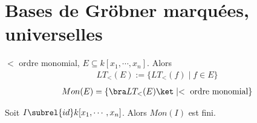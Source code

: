     \section{Bases de Gröbner marquées, universelles}
        \begin{nota}
            $<$ ordre monomial, $E \subseteq k[x_1, \cdots, x_n]$. Alors
            \begin{align*}
                LT_<(E) := \{LT_<(f) \mid f \in E\}
            \end{align*}
            \begin{align*}
                Mon(E) = \{\bra LT_<(E) \ket \mid < \text{ ordre monomial}\}
            \end{align*}
        \end{nota}
        \begin{theo}
            Soit $I \subrel{id} k[x_1, \cdots, x_n]$. Alors $Mon(I)$ est fini.
        \end{theo}
